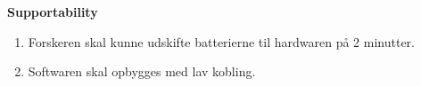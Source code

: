 \textbf{Supportability}
\begin{enumerate}
\item Forskeren skal kunne udskifte batterierne til hardwaren på 2 minutter. 
\item Softwaren skal opbygges med lav kobling. 
\end{enumerate}
















